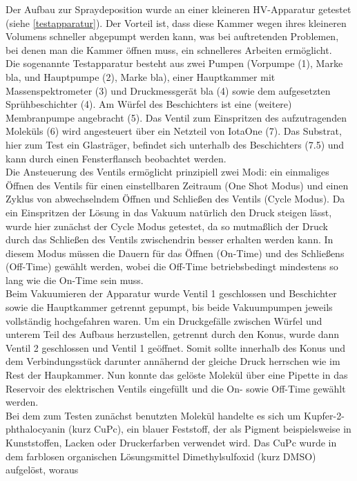 Der Aufbau zur Spraydeposition wurde an einer kleineren HV-Apparatur getestet (siehe \ref{testapparatur}). Der
Vorteil ist, dass diese Kammer wegen ihres kleineren Volumens schneller abgepumpt werden kann, was bei
auftretenden Problemen, bei denen man die Kammer öffnen muss, ein schnelleres Arbeiten ermöglicht.\\
Die sogenannte Testapparatur besteht aus zwei Pumpen (Vorpumpe (1), Marke bla, und Hauptpumpe (2), Marke bla),
einer Hauptkammer mit Massenspektrometer (3) und Druckmessgerät bla (4) sowie dem aufgesetzten
Sprühbeschichter (4). Am Würfel des Beschichters ist eine (weitere) Membranpumpe angebracht (5). Das Ventil
zum Einspritzen des aufzutragenden Moleküls (6) wird angesteuert über ein Netzteil von IotaOne (7). Das
Substrat, hier zum Test ein Glasträger, befindet sich unterhalb des Beschichters (7.5) und kann durch einen
Fensterflansch beobachtet werden.\\
Die Ansteuerung des Ventils ermöglicht
prinzipiell zwei Modi: ein einmaliges Öffnen des
Ventils für einen einstellbaren Zeitraum (One
Shot Modus) und einen Zyklus von abwechselndem
Öffnen und Schließen des Ventils (Cycle Modus).
Da ein Einspritzen der Lösung in das Vakuum
natürlich den Druck steigen lässt, wurde hier
zunächst der Cycle Modus getestet, da so
mutmaßlich der Druck durch das Schließen des
Ventils zwischendrin besser erhalten werden
kann. In diesem Modus müssen die Dauern für das
Öffnen (On-Time) und des Schließens (Off-Time)
gewählt werden, wobei die Off-Time
betriebsbedingt mindestens so lang wie die
On-Time sein muss.\\
Beim Vakuumieren der Apparatur wurde Ventil 1
 geschlossen und Beschichter sowie die 
 Hauptkammer getrennt gepumpt, bis beide
 Vakuumpumpen jeweils vollständig hochgefahren
 waren.
 Um ein Druckgefälle zwischen Würfel und unterem
 Teil des Aufbaus herzustellen, getrennt durch den
 Konus, wurde dann Ventil 2 geschlossen und
 Ventil 1 geöffnet.
 Somit sollte innerhalb des Konus und dem
 Verbindungsstück darunter annähernd der gleiche
 Druck herrschen wie im Rest der Haupkammer.
 Nun konnte das gelöste Molekül über eine Pipette
 in das Reservoir des elektrischen Ventils
 eingefüllt und die On- sowie Off-Time gewählt
 werden.\\
Bei dem zum Testen zunächst benutzten Molekül
handelte es sich um Kupfer-2-phthalocyanin (kurz
CuPc), ein blauer Feststoff, der als Pigment
beispielsweise in Kunststoffen, Lacken oder
Druckerfarben verwendet wird. Das CuPc wurde in
dem farblosen organischen Lösungsmittel
Dimethylsulfoxid (kurz DMSO) aufgelöst, woraus
